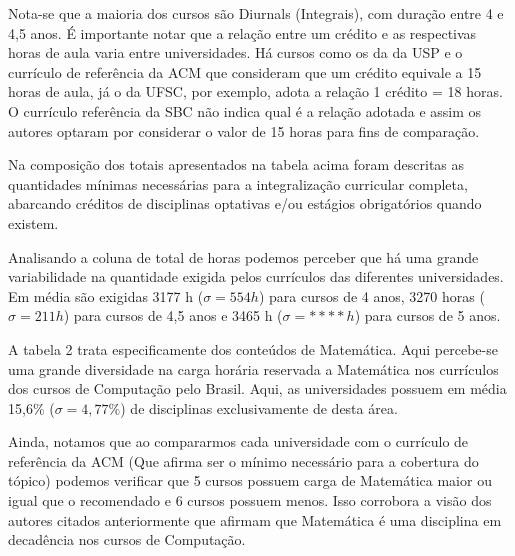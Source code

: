\documentclass[conference]{IEEEtran}
\begin{document}
	Nota-se que a maioria dos cursos são Diurnals (Integrais), com duração entre 4 e 4,5 anos. É importante notar que a relação entre um crédito e as respectivas horas de aula varia entre universidades. Há cursos como os da da USP e o currículo de referência da ACM que consideram que um crédito equivale a 15 horas de aula, já o da UFSC, por exemplo, adota a relação 1 crédito = 18 horas. O currículo referência da SBC não indica qual é a relação adotada e assim os autores optaram por considerar o valor de 15 horas para fins de comparação.

	Na composição dos totais apresentados na tabela acima foram descritas as quantidades mínimas necessárias para a integralização curricular completa, abarcando créditos de disciplinas optativas e/ou estágios obrigatórios quando existem. 

	Analisando a coluna de total de horas podemos perceber que há uma grande variabilidade na quantidade exigida pelos currículos das diferentes universidades. Em média são exigidas 3177 h ($\sigma = 554 h $) para cursos de 4 anos, 3270 horas ($\sigma = 211 h$) para cursos de 4,5 anos e 3465 h ($\sigma = **** h$) para cursos de 5 anos.

	A tabela 2 trata especificamente dos conteúdos de Matemática. Aqui percebe-se uma grande diversidade na carga horária reservada a Matemática nos currículos dos cursos de Computação pelo Brasil. Aqui, as universidades possuem em média 15,6\% ($\sigma = 4,77 \%$) de disciplinas exclusivamente de desta área.

	Ainda, notamos que ao compararmos cada universidade com o currículo de referência da ACM (Que afirma ser o mínimo necessário para a cobertura do tópico) podemos verificar que 5 cursos possuem carga de Matemática maior ou igual que o recomendado e 6 cursos possuem menos. Isso corrobora a visão dos autores citados anteriormente que afirmam que Matemática é uma disciplina em decadência nos cursos de Computação.
\end{document}
